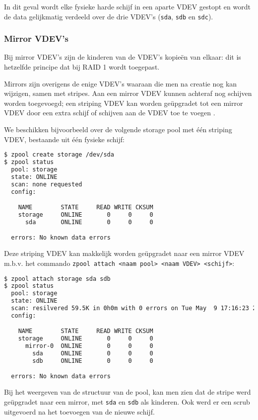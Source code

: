 In dit geval wordt elke fysieke harde schijf in een aparte VDEV gestopt en wordt de data gelijkmatig verdeeld over de drie VDEV's (\texttt{sda}, \texttt{sdb} en \texttt{sdc}).

\subsubsection{Mirror VDEV's}

Bij mirror VDEV's zijn de kinderen van de VDEV's kopieën van elkaar: dit is hetzelfde principe dat bij RAID 1 wordt toegepast. 

Mirrors zijn overigens de enige VDEV's waaraan die men na creatie nog kan wijzigen, samen met stripes. Aan een mirror VDEV kunnen achteraf nog schijven worden toegevoegd; een striping VDEV kan worden geüpgradet tot een mirror VDEV door een extra schijf of schijven aan de VDEV toe te voegen \autocite{FBSDDP2017}.

We beschikken bijvoorbeeld over de volgende storage pool met één striping VDEV, bestaande uit één fysieke schijf:

\begin{lstlisting}[language=bash,style=command_style]
$ zpool create storage /dev/sda
$ zpool status
  pool: storage
  state: ONLINE
  scan: none requested
  config:

	NAME        STATE     READ WRITE CKSUM
	storage     ONLINE       0     0     0
	  sda       ONLINE       0     0     0

  errors: No known data errors
\end{lstlisting}

Deze striping VDEV kan makkelijk worden geüpgradet naar een mirror VDEV m.b.v. het commando \texttt{zpool attach <naam pool> <naam VDEV> <schijf>}:

\begin{lstlisting}[language=bash,style=command_style]
$ zpool attach storage sda sdb
$ zpool status
  pool: storage
  state: ONLINE
  scan: resilvered 59.5K in 0h0m with 0 errors on Tue May  9 17:16:23 2017
  config:

	NAME        STATE     READ WRITE CKSUM
	storage     ONLINE       0     0     0
	  mirror-0  ONLINE       0     0     0
	    sda     ONLINE       0     0     0
	    sdb     ONLINE       0     0     0

  errors: No known data errors
\end{lstlisting}

Bij het weergeven van de structuur van de pool, kan men zien dat de stripe werd geüpgradet naar een mirror, met \texttt{sda} en \texttt{sdb} als kinderen. Ook werd er een scrub uitgevoerd na het toevoegen van de nieuwe schijf.

